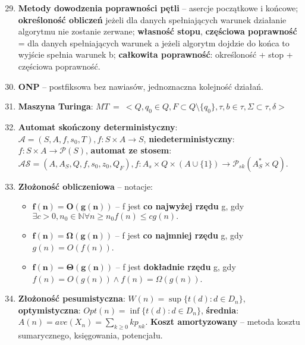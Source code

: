 \documentclass[12pt]{article}
\begin{document}
    \begin{enumerate}
        \setcounter{enumi}{28}
        \item \textbf{Metody dowodzenia poprawności pętli} -- asercje początkowe i końcowe; \textbf{określoność obliczeń}
        jeżeli dla danych spełniających warunek działanie algorytmu nie zostanie zerwane; \textbf{własność stopu},
        \textbf{częściowa poprawność} = dla danych spełniających warunek a jeżeli algorytm dojdzie do końca to wyjście
        spełnia warunek b; \textbf{całkowita poprawność}: określoność + stop + częściowa poprawność.

        \item \textbf{ONP} -- postfiksowa bez nawiasów, jednoznaczna kolejność działań.

        \item \textbf{Maszyna Turinga}: $MT ~ = ~<Q, q_0 \in Q, F \subset Q \setminus \{q_0\}, \tau, b \in \tau, \Sigma \subset \tau, \delta>$

        \item \textbf{Automat skończony deterministyczny}: $\mathcal{A} = (S, A, f, s_{0}, T), f: S\times A \rightarrow S$,
        \textbf{niedeterministyczny}: $f : S \times A \rightarrow \mathcal{P} (S)$, \textbf{automat ze stosem}:
        $\mathcal{AS} = (A, A_{S}, Q, f, s_{0}, z_{0}, Q_{F}), f: A_{s} \times Q \times (A \cup \{1\}) \rightarrow \mathcal{P}_{sk}(A^{*}_{S} \times Q)$.

        \item \textbf{Złożoność obliczeniowa} -- notacje:
        \begin{itemize}[noitemsep]
            \item $\mathbf{f(n) = O(g(n))}$ -- f jest \textbf{co najwyżej rzędu} g, gdy
            $\exists c > 0, n_0 \in \mathbb{N} \forall n \geq n_0 f(n) \leq cg(n).$
            \item $\mathbf{f(n) = \Omega(g(n))}$ -- f jest \textbf{co najmniej rzędu} g, gdy
            $g(n) = O(f(n))$.
            \item $\mathbf{f(n) = \Theta(g(n))}$ -- f jest \textbf{dokładnie rzędu} g, gdy
            $f(n) = O(g(n)) \wedge  f(n) = \Omega(g(n))$.
        \end{itemize}

        \item \textbf{Złożoność pesumistyczna}: $W(n) = \sup\{t(d) : d \in D_n\}$, \textbf{optymistyczna}:
        $Opt(n) = \inf\{t(d) : d \in D_n\}$, \textbf{średnia}: $A(n) = ave(X_n) = \sum_{k \geq 0}kp_{nk}$.
        \textbf{Koszt amortyzowany} -- metoda kosztu sumarycznego, księgowania, potencjału.


\end{enumerate}
\end{document}
